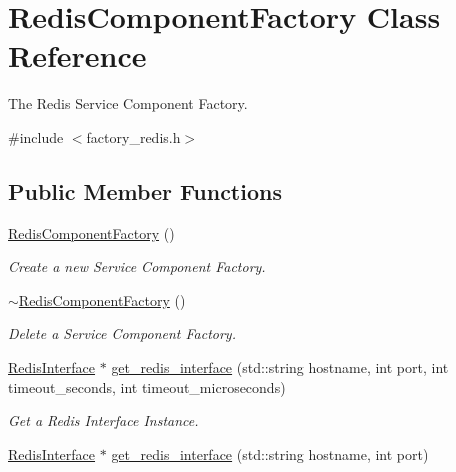 \hypertarget{classRedisComponentFactory}{}\section{Redis\+Component\+Factory Class Reference}
\label{classRedisComponentFactory}


The Redis Service Component Factory.  




{\ttfamily \#include $<$factory\+\_\+redis.\+h$>$}

\subsection*{Public Member Functions}
\begin{DoxyCompactItemize}
\item 
\hyperlink{classRedisComponentFactory_a4c51f92cdb5da1150476178d9f5ba970}{Redis\+Component\+Factory} ()\hypertarget{classRedisComponentFactory_a4c51f92cdb5da1150476178d9f5ba970}{}\label{classRedisComponentFactory_a4c51f92cdb5da1150476178d9f5ba970}

\begin{DoxyCompactList}\small\item\em Create a new Service Component Factory. \end{DoxyCompactList}\item 
\hyperlink{classRedisComponentFactory_adacdc2aa778f3efc793743557f1fb835}{$\sim$\+Redis\+Component\+Factory} ()\hypertarget{classRedisComponentFactory_adacdc2aa778f3efc793743557f1fb835}{}\label{classRedisComponentFactory_adacdc2aa778f3efc793743557f1fb835}

\begin{DoxyCompactList}\small\item\em Delete a Service Component Factory. \end{DoxyCompactList}\item 
\hyperlink{classRedisInterface}{Redis\+Interface} $\ast$ \hyperlink{classRedisComponentFactory_a86835044e78c217f480243a3743c09e3}{get\+\_\+redis\+\_\+interface} (std\+::string hostname, int port, int timeout\+\_\+seconds, int timeout\+\_\+microseconds)\hypertarget{classRedisComponentFactory_a86835044e78c217f480243a3743c09e3}{}\label{classRedisComponentFactory_a86835044e78c217f480243a3743c09e3}

\begin{DoxyCompactList}\small\item\em Get a Redis Interface Instance. \end{DoxyCompactList}\item 
\hyperlink{classRedisInterface}{Redis\+Interface} $\ast$ \hyperlink{classRedisComponentFactory_adbb025ff948be7a72da75c863974369b}{get\+\_\+redis\+\_\+interface} (std\+::string hostname, int port)\hypertarget{classRedisComponentFactory_adbb025ff948be7a72da75c863974369b}{}\label{classRedisComponentFactory_adbb025ff948be7a72da75c863974369b}


\end{DoxyCompactItemize}
